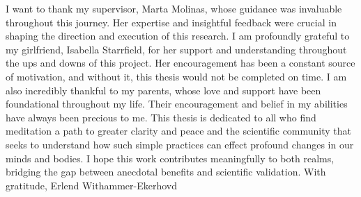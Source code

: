\newline
I want to thank my supervisor, Marta Molinas, whose guidance was invaluable throughout this journey. Her expertise and insightful feedback were crucial in shaping the direction and execution of this research. I am profoundly grateful to my girlfriend, Isabella Starrfield, for her support and understanding throughout the ups and downs of this project. Her encouragement has been a constant source of motivation, and without it, this thesis would not be completed on time.
\newline
I am also incredibly thankful to my parents, whose love and support have been foundational throughout my life. Their encouragement and belief in my abilities have always been precious to me.
This thesis is dedicated to all who find meditation a path to greater clarity and peace and the scientific community that seeks to understand how such simple practices can effect profound changes in our minds and bodies. I hope this work contributes meaningfully to both realms, bridging the gap between anecdotal benefits and scientific validation.
\newline
With gratitude,\newline
Erlend Withammer-Ekerhovd